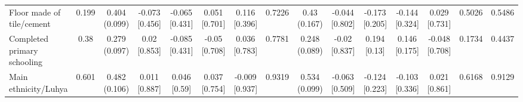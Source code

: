 {\begin{tabular}[t]{lcccccccccccccc}
\addlinespace[0.3em]
\hline
\multicolumn{15}{l}{\textit{\textbf{Panel B: Baseline demographics, $N=252$}}}\\
\hline
\hspace{1em}Floor made of tile/cement & 0.199 & \makecell[c]{0.404\\(0.099)} & \makecell[c]{-0.073\\{[0.456]}} & \makecell[c]{-0.065\\{[0.431]}} & \makecell[c]{0.051\\{[0.701]}} & \makecell[c]{0.116\\{[0.396]}} & 0.7226 & \makecell[c]{0.43\\(0.167)} & \makecell[c]{-0.044\\{[0.802]}} & \makecell[c]{-0.173\\{[0.205]}} & \makecell[c]{-0.144\\{[0.324]}} & \makecell[c]{0.029\\{[0.731]}} & 0.5026 & 0.5486\\
\hspace{1em}Completed primary schooling & 0.38 & \makecell[c]{0.279\\(0.097)} & \makecell[c]{0.02\\{[0.853]}} & \makecell[c]{-0.085\\{[0.431]}} & \makecell[c]{-0.05\\{[0.708]}} & \makecell[c]{0.036\\{[0.783]}} & 0.7781 & \makecell[c]{0.248\\(0.089)} & \makecell[c]{-0.02\\{[0.837]}} & \makecell[c]{0.194\\{[0.13]}} & \makecell[c]{0.146\\{[0.175]}} & \makecell[c]{-0.048\\{[0.708]}} & 0.1734 & 0.4437\\
\hspace{1em}Main ethnicity/Luhya & 0.601 & \makecell[c]{0.482\\(0.106)} & \makecell[c]{0.011\\{[0.887]}} & \makecell[c]{0.046\\{[0.59]}} & \makecell[c]{0.037\\{[0.754]}} & \makecell[c]{-0.009\\{[0.937]}} & 0.9319 & \makecell[c]{0.534\\(0.099)} & \makecell[c]{-0.063\\{[0.509]}} & \makecell[c]{-0.124\\{[0.223]}} & \makecell[c]{-0.103\\{[0.336]}} & \makecell[c]{0.021\\{[0.861]}} & 0.6168 & 0.9129\\

\end{tabular}}
